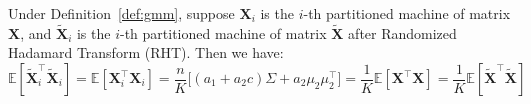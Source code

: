 \documentclass{beamer}
\theoremstyle{remark}
\begin{document}
\begin{frame}
\begin{lemma}
\label{lemma:expectation}
Under Definition~\ref{def:gmm}, suppose $\mathbf{X}_{i}$ is the $i$-th partitioned machine of matrix $\mathbf{X}$, and $\mathbf{\tilde{X}}_{i}$ is the $i$-th partitioned machine of matrix $\mathbf{\tilde{X}}$ after Randomized Hadamard Transform (RHT).
Then we have:
\begin{equation*}
  \mathbb{E}[\tilde{\mathbf{X}}_i^{\top}\tilde{\mathbf{X}}_i]
    =\mathbb{E}[{\mathbf{X}}_i^{\top}{\mathbf{X}}_i]
    =\frac{n}{K}\bigl[(a_{1}+a_{2}c)\Sigma+a_{2}\mu_{2}\mu_{2}^{\top}\bigr]
    = \frac{1}{K} \mathbb{E}[\mathbf{X}^{\top} \mathbf{X}]
    = \frac{1}{K} \mathbb{E}[\mathbf{\tilde{X}}^{\top} \mathbf{\tilde{X}}]
\end{equation*}
\end{lemma}
\end{frame}
\end{document}
